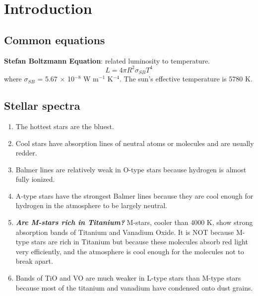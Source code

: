 \chapter{Introduction}
\section{Common equations}

\textbf{Stefan Boltzmann Equation}: related luminosity to temperature.
\begin{equation}
    L = 4 \pi R^2 \sigma_{SB} T^4
\end{equation}
where $\sigma_{SB}$ = 5.67 $\times$ 10$^{-8}$ W m$^{-1}$ K$^{-4}$.
The sun's effective temperature is 5780 K.

\section{Stellar spectra}
\begin{enumerate}
    \item The hottest stars are the bluest.
    \item Cool stars have absorption lines of neutral atoms or molecules and are usually redder.
    \item Balmer lines are relatively weak in O-type stars because hydrogen is almost fully ionized.
    \item A-type stars have the strongest Balmer lines because they are cool enough for hydrogen in the atmosphere to be largely neutral.
    \item \textit{\textbf{Are M-stars rich in Titanium?}} M-stars, cooler than 4000 K, show strong absorption bands of Titanium and Vanadium Oxide. It is NOT because M-type stars are rich in Titanium but because these molecules absorb red light very efficiently, and the atmosphere is cool enough for the molecules not to break apart. 
    \item Bands of TiO and VO are much weaker in L-type stars than M-type stars because most of the titanium and vanadium have condensed onto dust grains.
    
\end{enumerate}

